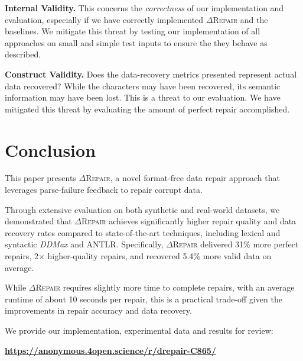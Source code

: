 \documentclass[sigconf,review,anonymous]{acmart}
\newcommand{\formatfree}{format-free\xspace}
\newcommand{\dtask}{data repair\xspace}
\newcommand{\approach}{\textsc{$\Delta$Repair}\xspace}
\newcommand{\ddmax}{\textit{DDMax}\xspace}
\newcommand{\drepair}{\approach}
\begin{document}
\noindent\textbf{Internal Validity.} This concerns the \textit{correctness} of our implementation and evaluation, especially if we have correctly implemented \approach and the baselines. We mitigate this threat by testing our implementation of all approaches on small and simple test inputs to ensure the they behave as described. 

\noindent\textbf{Construct Validity.} 
Does the data-recovery metrics presented
represent actual data recovered? While the characters may have been recovered,
its semantic information may have been lost. This is a threat to our evaluation.
We have mitigated this threat by evaluating the amount of perfect repair accomplished.


\section{Conclusion}
\label{sec:conclusion}

This paper presents \drepair, a novel \formatfree \dtask approach that
leverages parse-failure feedback to repair corrupt data.

Through extensive evaluation on both synthetic and real-world
datasets, we demonstrated that \drepair achieves significantly higher repair
quality and data recovery rates compared to state-of-the-art techniques,
including lexical and syntactic \ddmax and ANTLR. Specifically, \drepair
delivered 31\% more perfect repairs, %
2$\times$ higher-quality repairs, %
and recovered 5.4\% more valid data on average. %

While \drepair requires slightly more time to complete repairs, with an average
runtime of about 10 seconds per repair, this is a practical trade-off given the
improvements in repair accuracy and data recovery.

We provide our implementation, experimental data and results for review:

\begin{center}
   \textbf{\url{https://anonymous.4open.science/r/drepair-C865/}} %
\end{center}




\end{document}
